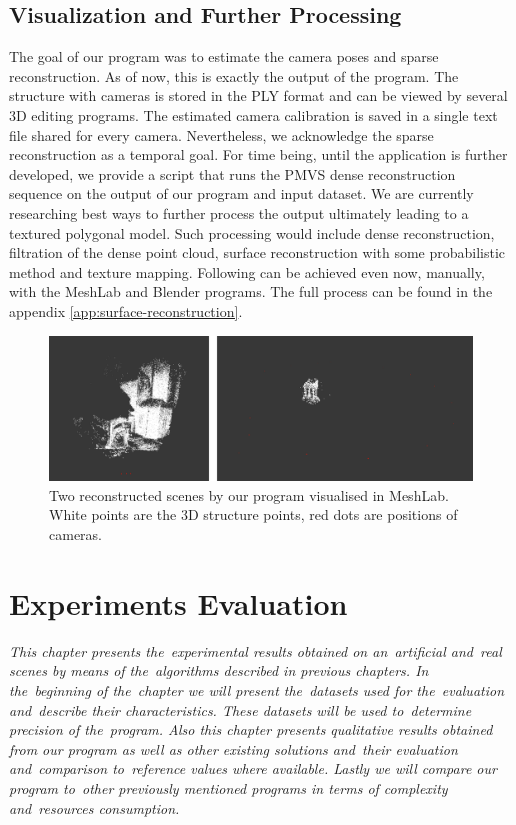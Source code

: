 \section{Visualization and Further Processing}
The goal of our program was to estimate the camera poses and sparse reconstruction. As of now, this is exactly the output of the program. The structure with cameras is stored in the PLY format and can be viewed by several 3D editing programs. The estimated camera calibration is saved in a single text file shared for every camera. Nevertheless, we acknowledge the sparse reconstruction as a temporal goal. For time being, until the application is further developed, we provide a script that runs the PMVS dense reconstruction sequence on the output of our program and input dataset. We are currently researching best ways to further process the output ultimately leading to a textured polygonal model. Such processing would include dense reconstruction, filtration of the dense point cloud, surface reconstruction with some probabilistic method and texture mapping. Following can be achieved even now, manually, with the MeshLab and Blender programs. The full process can be found in the appendix \ref{app:surface-reconstruction}.

\begin{figure}[ht]
	\begin{center}
		\includegraphics[keepaspectratio,width=\textwidth]{fig/visualisation.pdf}
	\end{center}
	\caption{Two reconstructed scenes by our program visualised in MeshLab. White points are the 3D structure points, red dots are positions of cameras.}
	\label{fig:visualisation}
\end{figure}

\chapter{Experiments Evaluation}
\label{chapter:experiments}
\textit{This chapter presents the~experimental results obtained on an~artificial and~real scenes by means of the~algorithms described in previous chapters. In the~beginning of the~chapter we will present the~datasets used for the~evaluation and~describe their characteristics. These datasets will be used to~determine precision of the~program. Also this chapter presents qualitative results obtained from our program as well as other existing solutions and~their evaluation and~comparison to~reference values where available. Lastly we will compare our program to~other previously mentioned programs in terms of complexity and~resources consumption. }
